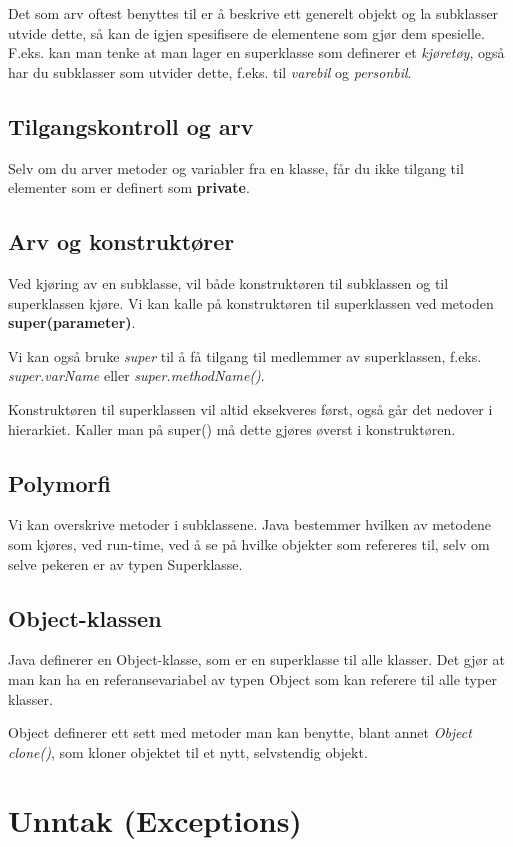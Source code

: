 \documentclass[11pt]{article}
\begin{document}
Det som arv oftest benyttes til er å beskrive ett generelt objekt og
la subklasser utvide dette, så kan de igjen spesifisere de elementene
som gjør dem spesielle. F.eks. kan man tenke at man lager en
superklasse som definerer et \emph{kjøretøy}, også har du subklasser som
utvider dette, f.eks. til \emph{varebil} og \emph{personbil}.
\subsection{Tilgangskontroll og arv}
\label{sec-15_2}


Selv om du arver metoder og variabler fra en klasse, får du ikke
tilgang til elementer som er definert som \textbf{private}.
\subsection{Arv og konstruktører}
\label{sec-15_3}


Ved kjøring av en subklasse, vil både konstruktøren til subklassen og
til superklassen kjøre. Vi kan kalle på konstruktøren til superklassen
ved metoden \textbf{super(parameter)}.

Vi kan også bruke \emph{super} til å få tilgang til medlemmer av
superklassen, f.eks. \emph{super.varName} eller \emph{super.methodName()}.

Konstruktøren til superklassen vil altid eksekveres først, også går
det nedover i hierarkiet. Kaller man på super() må dette gjøres øverst
i konstruktøren.
\subsection{Polymorfi}
\label{sec-15_4}

Vi kan overskrive metoder i subklassene. Java bestemmer hvilken av
metodene som kjøres, ved run-time, ved å se på hvilke objekter som
refereres til, selv om selve pekeren er av typen Superklasse. 
\subsection{Object-klassen}
\label{sec-15_5}

Java definerer en Object-klasse, som er en superklasse til alle
klasser. Det gjør at man kan ha en referansevariabel av typen Object
som kan referere til alle typer klasser.

Object definerer ett sett med metoder man kan benytte, blant annet
\emph{Object clone()}, som kloner objektet til et nytt, selvstendig objekt.
\section{Unntak (Exceptions)}
\label{sec-16}
\end{document}
